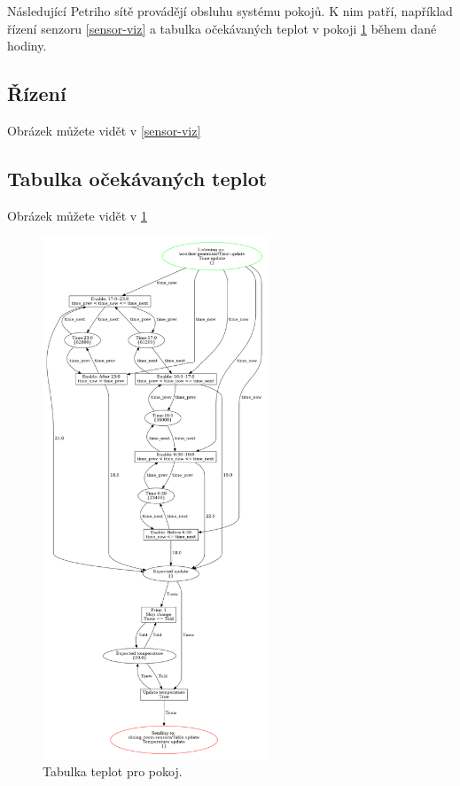 Následující Petriho sítě provádějí obsluhu systému pokojů. K nim patří, například řízení senzoru \ref{sensor-viz} a tabulka očekávaných teplot v pokoji \ref{room-table-viz} během dané hodiny.

\subsection{Řízení}

Obrázek můžete vidět v \ref{sensor-viz}

\subsection{Tabulka očekávaných teplot}

Obrázek můžete vidět v \ref{room-table-viz}

\begin{figure}[htb]
 \centering
 \includegraphics[width=0.6\textwidth]{obrazky-figures/room-timetable.png}
 \caption{Tabulka teplot pro pokoj.}
 \label{room-table-viz}
\end{figure}

